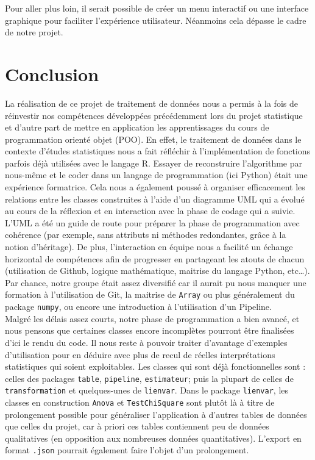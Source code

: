 \documentclass[11pt]{article}
\begin{document}
Pour aller plus loin, il serait possible de créer un menu interactif ou une interface graphique pour faciliter l'expérience utilisateur. Néanmoins cela dépasse le cadre de notre projet.



\newpage
\section*{Conclusion}

La réalisation de ce projet de traitement de données nous a permis à la fois de réinvestir nos compétences développées précédemment lors du projet statistique et d'autre part de mettre en application les apprentissages du cours de programmation orienté objet (POO). En effet, le traitement de données dans le contexte d'études statistiques nous a fait réfléchir à l'implémentation de fonctions parfois déjà utilisées avec le langage R. Essayer de reconstruire l'algorithme par nous-même et le coder dans un langage de programmation (ici Python) était une expérience formatrice. Cela nous a également poussé à organiser efficacement les relations entre les classes construites à l'aide d'un diagramme UML qui a évolué au cours de la réflexion et en interaction avec la phase de codage qui a suivie. L'UML a été un guide de route pour préparer la phase de programmation avec cohérence (par exemple, sans attributs ni méthodes redondantes, grâce à la notion d'héritage). De plus, l'interaction en équipe nous a facilité un échange horizontal de compétences afin de progresser en partageant les atouts de chacun (utilisation de Github, logique mathématique, maitrise du langage Python, etc…). Par chance, notre groupe était assez diversifié car il aurait pu nous manquer une formation à l'utilisation de Git, la maitrise de \texttt{Array} ou plus généralement du package \texttt{numpy}, ou encore une introduction à l'utilisation d'un Pipeline. \\

Malgré les délais assez courts, notre phase de programmation a bien avancé, et nous pensons que certaines classes encore incomplètes pourront être finalisées d'ici le rendu du code. Il nous reste à pouvoir traiter d'avantage d'exemples d'utilisation pour en déduire avec plus de recul de réelles interprétations statistiques qui soient exploitables. Les classes qui sont déjà fonctionnelles sont : celles des packages \texttt{table}, \texttt{pipeline}, \texttt{estimateur}; puis la plupart de celles de \texttt{transformation} et quelques-unes de \texttt{lienvar}. Dans le package \texttt{lienvar}, les classes en construction \texttt{Anova} et \texttt{TestChiSquare} sont plutôt là à titre de prolongement possible pour généraliser l'application à d'autres tables de données que celles du projet, car à priori ces tables contiennent peu de données qualitatives (en opposition aux nombreuses données quantitatives). L'export en format \texttt{.json} pourrait également faire l'objet d'un prolongement. \\
\end{document}

